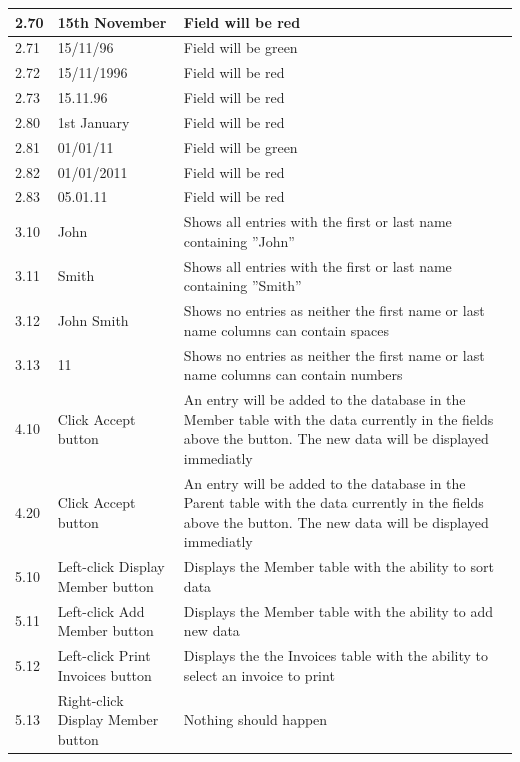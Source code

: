 \begin{landscape}
\begin{center}
\begin{longtable}{|p{2cm}|p{5cm}|p{8cm}|}
        2.70 & 15th November & Field will be red \\ \hline
        2.71 & 15/11/96 & Field will be green \\ \hline
        2.72 & 15/11/1996 & Field will be red \\ \hline
        2.73 & 15.11.96 & Field will be red \\ \hline
        
        2.80 & 1st January & Field will be red \\ \hline
        2.81 & 01/01/11 & Field will be green \\ \hline
        2.82 & 01/01/2011 & Field will be red \\ \hline
        2.83 & 05.01.11 & Field will be red \\ \hline
        
        3.10 & John & Shows all entries with the first or last name containing ''John'' \\ \hline
        3.11 & Smith & Shows all entries with the first or last name containing ''Smith'' \\ \hline
        3.12 & John Smith &  Shows no entries as neither the first name or last name columns can contain spaces \\ \hline
        3.13 & 11 & Shows no entries as neither the first name or last name columns can contain numbers \\ \hline
        
        4.10 & Click Accept button & An entry will be added to the database in the Member table with the data currently in the fields above the button. The new data will be displayed immediatly \\ \hline
        
        4.20 & Click Accept button & An entry will be added to the database in the Parent table with the data currently in the fields above the button. The new data will be displayed immediatly \\ \hline
        
        5.10 & Left-click Display Member button & Displays the Member table with the ability to sort data \\ \hline
        5.11 & Left-click Add Member button & Displays the Member table with the ability to add new data \\ \hline
        5.12 & Left-click Print Invoices button & Displays the the Invoices table with the ability to select an invoice to print \\ \hline
        5.13 & Right-click Display Member button & Nothing should happen \\ \hline
        

\end{longtable}
\end{center}
\end{landscape}
